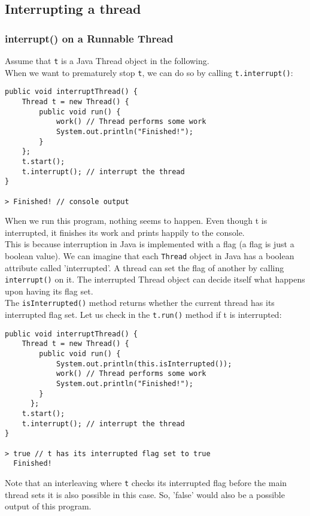 \documentclass[main.tex]{subfiles}
\begin{document}
\subsection{Interrupting a thread}
\subsubsection{interrupt() on a Runnable Thread}
Assume that \texttt{t} is a Java Thread object in the following.\\
When we want to prematurely stop \texttt{t}, we can do so by calling \texttt{t.interrupt()}:
\begin{verbatim}
public void interruptThread() {
    Thread t = new Thread() {
        public void run() {
            work() // Thread performs some work
            System.out.println("Finished!");
        }
    };
    t.start();
    t.interrupt(); // interrupt the thread
}

> Finished! // console output
\end{verbatim}
When we run this program, nothing seems to happen. Even though t is interrupted, it finishes its work and prints happily to the console.\\
This is because interruption in Java is implemented with a flag (a flag is just a boolean value). We can imagine that each \texttt{Thread} object in Java has a boolean attribute called 'interrupted'. A thread can set the flag of another by calling \texttt{interrupt()} on it. The interrupted Thread object can decide itself what happens upon having its flag set.\\
The \texttt{isInterrupted()} method returns whether the current thread has its interrupted flag set. Let us check in the \texttt{t.run()} method if t is interrupted:
\begin{verbatim}
public void interruptThread() {
    Thread t = new Thread() {
        public void run() {
            System.out.println(this.isInterrupted());
            work() // Thread performs some work
            System.out.println("Finished!");
        }
      };
    t.start();
    t.interrupt(); // interrupt the thread
}

> true // t has its interrupted flag set to true
  Finished!
\end{verbatim}
Note that an interleaving where \texttt{t} checks its interrupted flag before the main thread sets it is also possible in this case. So, 'false' would also be a possible output of this program.
\end{document}
